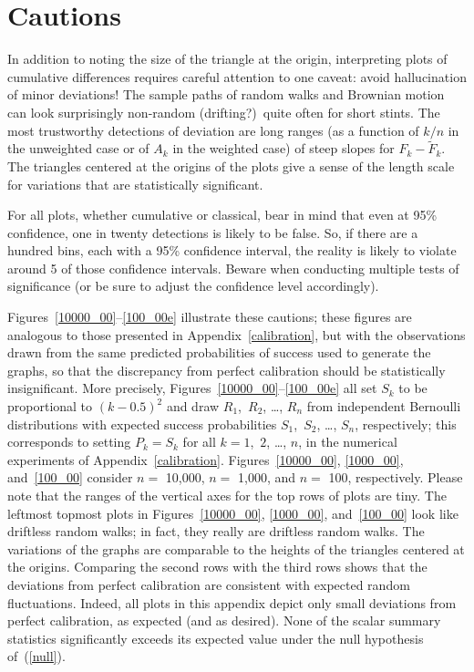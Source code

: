 \documentclass{article}
\begin{document}
\clearpage



\section{Cautions}
\label{caution}

In addition to noting the size of the triangle at the origin,
interpreting plots of cumulative differences
requires careful attention to one caveat:
avoid hallucination of minor deviations!
The sample paths of random walks and Brownian motion can look surprisingly
non-random (drifting?)\ quite often for short stints.
The most trustworthy detections of deviation are long ranges
(as a function of $k/n$ in the unweighted case
or of $A_k$ in the weighted case) of steep slopes for $F_k-\tilde{F}_k$.
The triangles centered at the origins of the plots give a sense
of the length scale for variations that are statistically significant.

For all plots, whether cumulative or classical,
bear in mind that even at 95\% confidence, one in twenty detections
is likely to be false. So, if there are a hundred bins,
each with a 95\% confidence interval, the reality is likely to violate
around 5 of those confidence intervals.
Beware when conducting multiple tests of significance
(or be sure to adjust the confidence level accordingly).

Figures~\ref{10000_00}--\ref{100_00e} illustrate these cautions;
these figures are analogous to those presented in Appendix~\ref{calibration},
but with the observations drawn from the same predicted probabilities
of success used to generate the graphs, so that the discrepancy
from perfect calibration should be statistically insignificant.
More precisely, Figures~\ref{10000_00}--\ref{100_00e}
all set $S_k$ to be proportional to $(k-0.5)^2$
and draw $R_1$,~$R_2$, \dots, $R_n$ from independent Bernoulli distributions
with expected success probabilities $S_1$,~$S_2$, \dots, $S_n$, respectively;
this corresponds to setting $P_k = S_k$ for all $k = 1$,~$2$, \dots, $n$,
in the numerical experiments of Appendix~\ref{calibration}.
Figures~\ref{10000_00}, \ref{1000_00}, and~\ref{100_00}
consider $n =$ 10,000, $n =$ 1,000, and $n =$ 100, respectively.
Please note that the ranges of the vertical axes
for the top rows of plots are tiny.
The leftmost topmost plots in Figures~\ref{10000_00}, \ref{1000_00},
and~\ref{100_00} look like driftless random walks;
in fact, they really are driftless random walks.
The variations of the graphs are comparable to the heights
of the triangles centered at the origins.
Comparing the second rows with the third rows
shows that the deviations from perfect calibration
are consistent with expected random fluctuations.
Indeed, all plots in this appendix depict only small deviations
from perfect calibration, as expected (and as desired).
None of the scalar summary statistics significantly exceeds
its expected value under the null hypothesis of~(\ref{null}).
\end{document}
